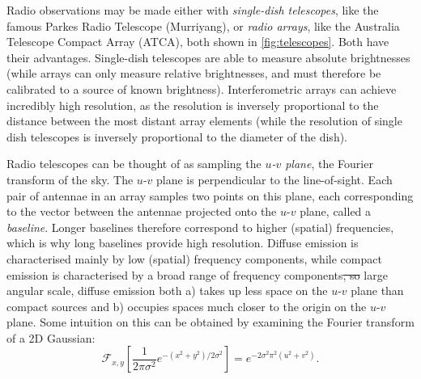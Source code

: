 \documentclass[11pt, a4paper]{book}
\newcommand{\defn}[1]{\emph{#1}}
\providecommand{\DIFaddtex}[1]{{\protect\color{blue}\uwave{#1}}} %
\providecommand{\DIFdeltex}[1]{{\protect\color{red}\sout{#1}}}                      %
\providecommand{\DIFaddbegin}{} %
\providecommand{\DIFaddend}{} %
\providecommand{\DIFdelbegin}{} %
\providecommand{\DIFdelend}{} %
\providecommand{\DIFadd}[1]{\texorpdfstring{\DIFaddtex{#1}}{#1}} %
\providecommand{\DIFdel}[1]{\texorpdfstring{\DIFdeltex{#1}}{}} %
\newcommand{\DIFscaledelfig}{0.5}
\newlength{\DIFdelgraphicswidth} %
\newlength{\DIFdelgraphicsheight} %
\newcommand{\DIFaddincludegraphics}[2][]{{\color{blue}\fbox{\DIFOincludegraphics[#1]{#2}}}} %
\newcommand{\DIFdelincludegraphics}[2][]{%
\sbox{\DIFdelgraphicsbox}{\DIFOincludegraphics[#1]{#2}}%
\settoboxwidth{\DIFdelgraphicswidth}{\DIFdelgraphicsbox} %
\settoboxtotalheight{\DIFdelgraphicsheight}{\DIFdelgraphicsbox} %
\scalebox{\DIFscaledelfig}{%
\parbox[b]{\DIFdelgraphicswidth}{\usebox{\DIFdelgraphicsbox}\\[-\baselineskip] \rule{\DIFdelgraphicswidth}{0em}}\llap{\resizebox{\DIFdelgraphicswidth}{\DIFdelgraphicsheight}{%
\setlength{\unitlength}{\DIFdelgraphicswidth}%
\begin{picture}(1,1)%
\thicklines\linethickness{2pt} %
{\color[rgb]{1,0,0}\put(0,0){\framebox(1,1){}}}%
{\color[rgb]{1,0,0}\put(0,0){\line( 1,1){1}}}%
{\color[rgb]{1,0,0}\put(0,1){\line(1,-1){1}}}%
\end{picture}%
}\hspace*{3pt}}} %
} %
\DeclareRobustCommand{\DIFaddbegin}{\DIFOaddbegin \let\includegraphics\DIFaddincludegraphics} %
\DeclareRobustCommand{\DIFaddend}{\DIFOaddend \let\includegraphics\DIFOincludegraphics} %
\DeclareRobustCommand{\DIFdelbegin}{\DIFOdelbegin \let\includegraphics\DIFdelincludegraphics} %
\DeclareRobustCommand{\DIFdelend}{\DIFOaddend \let\includegraphics\DIFOincludegraphics} %
\begin{document}
        Radio observations may be made either with \defn{single-dish telescopes}, like the famous Parkes Radio Telescope (Murriyang), or \defn{radio arrays}, like the Australia Telescope Compact Array (ATCA), both shown in \autoref{fig:telescopes}. Both have their advantages. Single-dish telescopes are able to measure absolute brightnesses (while arrays can only measure relative brightnesses, and must therefore be calibrated to a source of known brightness). Interferometric arrays can achieve incredibly high resolution, as the resolution is inversely proportional to the distance between the most distant array elements (while the resolution of single dish telescopes is inversely proportional to the diameter of the dish).

        Radio telescopes can be thought of as sampling the \defn{$u$-$v$ plane}, the Fourier transform of the sky. The $u$-$v$ plane is perpendicular to the line-of-sight. Each pair of antennae in an array samples two points on this plane, each corresponding to the vector between the antennae projected onto the $u$-$v$ plane, called a \defn{baseline}. Longer baselines therefore correspond to higher (spatial) frequencies, which is why long baselines provide high resolution. Diffuse emission is characterised mainly by low (spatial) frequency components, while compact emission is characterised by a broad range of frequency components\DIFdelbegin \DIFdel{, so }\DIFdelend \DIFaddbegin \DIFadd{. This means that }\DIFaddend large angular scale, diffuse emission both a) takes up less space on the $u$-$v$ plane than compact sources and b) occupies spaces much closer to the origin on the $u$-$v$ plane. Some intuition on this can be obtained by examining the Fourier transform of a 2D Gaussian:
        \begin{equation}
            \mathcal F_{x, y}\left[\frac{1}{2\pi\sigma^2} e^{-(x^2 + y^2) / 2\sigma^2}\right] = e^{-2\sigma^2 \pi^2(u^2 + v^2)}.
        \end{equation}
\end{document}
